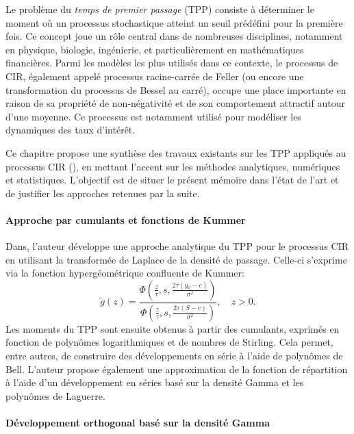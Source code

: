 \label{sec:RevLitt}

Le problème du \textit{temps de premier passage} (\acs{TPP}) consiste à déterminer le moment où un processus stochastique atteint un seuil prédéfini pour la première fois. Ce concept joue un rôle central dans de nombreuses disciplines, notamment en physique, biologie, ingénierie, et particulièrement en mathématiques financières. Parmi les modèles les plus utilisés dans ce contexte, le processus de \ac{CIR}, également appelé processus racine-carrée de Feller (ou encore une transformation du processus de Bessel au carré), occupe une place importante en raison de sa propriété de non-négativité et de son comportement attractif autour d'une moyenne. Ce processus est notamment utilisé pour modéliser les dynamiques des taux d'intérêt.

Ce chapitre propose une synthèse des travaux existants sur les \acs{TPP} appliqués au processus \acs{CIR} (\cite{dinardo2021,dinardo2024,kepplinger2017,giorno2021,giorno2023,martin2011,masoliver2012}), en mettant l'accent sur les méthodes analytiques, numériques et statistiques. L'objectif est de situer le présent mémoire dans l'état de l'art et de justifier les approches retenues par la suite.

\paragraph{Approche par cumulants et fonctions de Kummer}

Dans\cite{dinardo2021}, l'auteur développe une approche analytique du \acs{TPP} pour le processus \acs{CIR} en utilisant la transformée de Laplace de la densité de passage. Celle-ci s'exprime via la fonction hypergéométrique confluente de Kummer:
\[
\tilde{g}(z) = \frac{\Phi\left(\frac{z}{\tau}, s, \frac{2\tau(y_0-c)}{\sigma^2}\right)}{\Phi\left(\frac{z}{\tau}, s, \frac{2\tau(S-c)}{\sigma^2}\right)}, \quad z > 0.
\]
Les moments du \acs{TPP} sont ensuite obtenus à partir des cumulants, exprimés en fonction de polynômes logarithmiques et de nombres de Stirling. Cela permet, entre autres, de construire des développements en série à l'aide de polynômes de Bell. L'auteur propose également une approximation de la fonction de répartition à l'aide d'un développement en séries basé sur la densité Gamma et les polynômes de Laguerre.

\paragraph{Développement orthogonal basé sur la densité Gamma}

